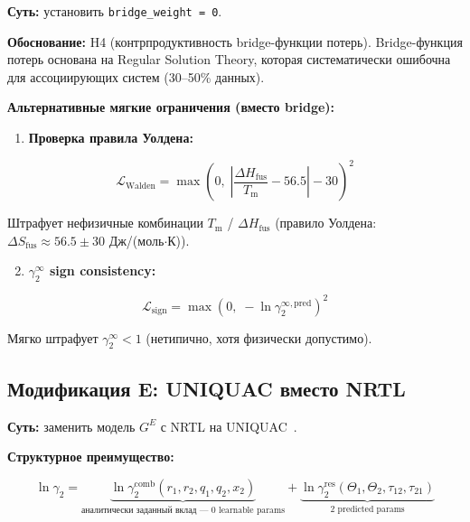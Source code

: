 \documentclass[11pt]{article}
\begin{document}
\textbf{Суть:} установить \texttt{bridge\_weight = 0}.

\textbf{Обоснование:} H4 (контрпродуктивность bridge-функции потерь). Bridge-функция потерь основана на Regular Solution Theory, которая систематически ошибочна для ассоциирующих систем (30--50\% данных).

\textbf{Альтернативные мягкие ограничения (вместо bridge):}

\begin{enumerate}
  \item \textbf{Проверка правила Уолдена:}
\end{enumerate}

\begin{equation*}
\mathcal{L}_{\mathrm{Walden}} = \max\!\left(0,\; \left|\frac{\Delta H_{\mathrm{fus}}}{T_{\mathrm{m}}} - 56.5\right| - 30\right)^2
\end{equation*}

Штрафует нефизичные комбинации $T_{\mathrm{m}}$ / $\Delta H_{\mathrm{fus}}$ (правило Уолдена: $\Delta S_{\mathrm{fus}} \approx 56.5 \pm 30$ Дж/(моль$\cdot$К)).

\begin{enumerate}
\setcounter{enumi}{1}
  \item \textbf{$\gamma_2^\infty$ sign consistency:}
\end{enumerate}

\begin{equation*}
\mathcal{L}_{\mathrm{sign}} = \max\!\left(0,\; -\ln\gamma_2^{\infty,\mathrm{pred}}\right)^2
\end{equation*}

Мягко штрафует $\gamma_2^\infty < 1$ (нетипично, хотя физически допустимо).

\subsection{Модификация E: UNIQUAC вместо NRTL}
\label{subsec:mod-e}

\textbf{Суть:} заменить модель $G^E$ с NRTL на UNIQUAC~\cite{abrams1975,prausnitz1998}.

\textbf{Структурное преимущество:}

\begin{equation*}
\ln\gamma_2 = \underbrace{\ln\gamma_2^{\mathrm{comb}}(r_1, r_2, q_1, q_2, x_2)}_{\text{аналитически заданный вклад --- 0 learnable params}} + \underbrace{\ln\gamma_2^{\mathrm{res}}(\Theta_1, \Theta_2, \tau_{12}, \tau_{21})}_{\text{2 predicted params}}
\end{equation*}
\end{document}

